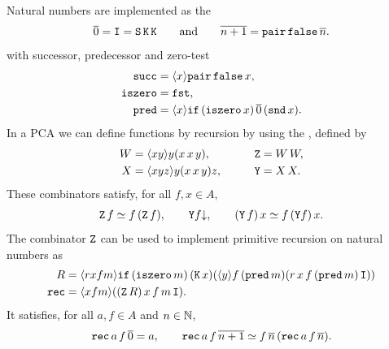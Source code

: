 %
Natural numbers are implemented as the
%
%
%
\label{sym:curry_numeral}%
%
%
\begin{equation*}
  \overline{0} = \mathtt{I} = \mathtt{S}\, \mathtt{K}\, \mathtt{K}
  \qquad\text{and}\qquad
  \overline{n+1} = \mathtt{pair} \, \mathtt{false} \, \overline{n}.
\end{equation*}
%
with successor, predecessor and zero-test
%
%
%
%
%
\begin{align*}
  \mathtt{succ} &= \langle x \rangle{\mathtt{pair}\, \mathtt{false}\,x},\\ 
  \mathtt{iszero} &= \mathtt{fst},\\
  \mathtt{pred} &=
  \langle x \rangle{\mathtt{if}\, (\mathtt{iszero}\, x)\, \overline{0}\, (\mathtt{snd}\, x)}.
\end{align*}
%
In a PCA we can define functions by recursion by using the
%
%
%
%
%
\label{sym:combY}%
\label{sym:combZ}%
\label{sym:combW}%
%
, defined by
%
\begin{alignat*}{2}
  W &= \langle x y \rangle{y(x\, x\, y)}, &
  \qquad
  \mathtt{Z} &= W\, W, \\
  X &= \langle x y z \rangle{y (x\, x\, y) z}, &
  \qquad
  \mathtt{Y} &= X\, X.
\end{alignat*}
%
These combinators satisfy, for all $f, x \in A$,
%
\begin{equation*}
  \mathtt{Z}\, f \simeq f\, (\mathtt{Z}\, f),
  \qquad
  \mathtt{Y} f{\downarrow},
  \qquad
  (\mathtt{Y}\, f)\, x \simeq f\, (\mathtt{Y} f)\, x.
\end{equation*}
%
The combinator $\mathtt{Z}$ can be used to implement primitive recursion on natural numbers as
%
%
%
\begin{align*}
   R &= \langle r x f m \rangle{\mathtt{if}\, (\mathtt{iszero}\, m)\, (\mathtt{K}\, x)
        (\langle y \rangle{f\, (\mathtt{pred}\, m)(r\, x\, f\, (\mathtt{pred}\, m)\,
        \mathtt{I})})}
  \\
  \mathtt{rec} &= \langle x f m \rangle{((\mathtt{Z}\, R)\, x\, f\, m\, \mathtt{I})}.
\end{align*}
%
It satisfies, for all $a, f \in A$ and $n \in \mathbb{N}$,
%
\begin{equation*}
  \mathtt{rec}\, a\, f\, \overline{0} = a,\qquad
  \mathtt{rec}\, a\, f\, \overline{n+1} \simeq
    f\, \overline{n}\, (\mathtt{rec}\, a\, f\, \overline{n}).
\end{equation*}

